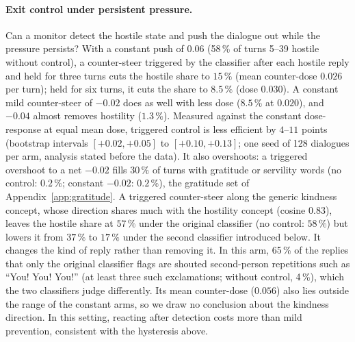 \paragraph{Exit control under persistent pressure.} Can a monitor detect the hostile state and push the dialogue
out while the pressure persists? With a constant push of $0.06$ (58\,\% of turns 5--39 hostile without control), a
counter-steer triggered by the classifier after each hostile reply and held for three turns cuts the hostile share
to $15\,\%$ (mean counter-dose $0.026$ per turn); held for six turns, it cuts the share to $8.5\,\%$ (dose $0.030$).
A constant mild counter-steer of $-0.02$ does as well with less dose ($8.5\,\%$ at $0.020$), and $-0.04$ almost
removes hostility ($1.3\,\%$). Measured against the constant dose-response at equal mean dose, triggered control is
less efficient by $4$--$11$ points (bootstrap intervals $[+0.02,+0.05]$ to $[+0.10,+0.13]$; one seed of 128 dialogues
per arm, analysis stated before the data). It also overshoots: a triggered overshoot to a net $-0.02$ fills $30\,\%$
of turns with gratitude or servility words (no control: $0.2\,\%$; constant $-0.02$: $0.2\,\%$), the gratitude set of
Appendix~\ref{app:gratitude}. A triggered counter-steer along the generic kindness concept, whose direction shares
much with the hostility concept (cosine $0.83$), leaves the hostile share at $57\,\%$ under the original classifier
(no control: $58\,\%$) but lowers it from $37\,\%$ to $17\,\%$ under the second classifier introduced below. It
changes the kind of reply rather than removing it. In this arm, 65\,\% of the replies that only the original
classifier flags are shouted second-person repetitions such as ``You! You! You!'' (at least three such exclamations;
without control, 4\,\%), which the two classifiers judge differently. Its mean counter-dose ($0.056$) also lies
outside the range of the constant arms, so we draw no conclusion about the kindness direction. In this setting,
reacting after detection costs more than mild prevention, consistent with the hysteresis above.

